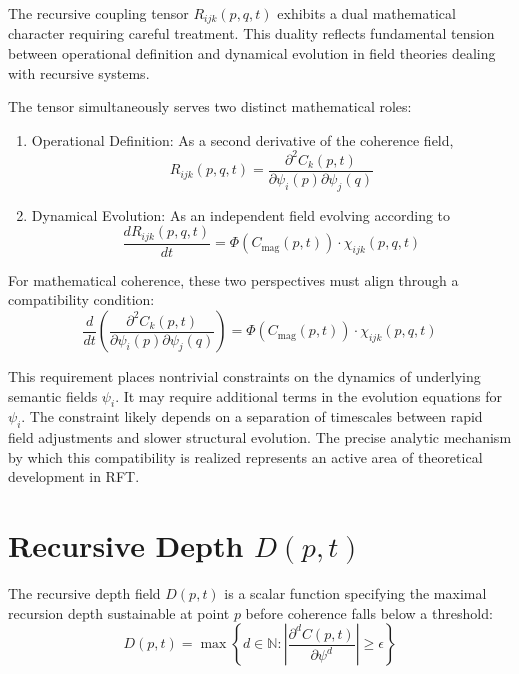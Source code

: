 The recursive coupling tensor \(R_{ijk}(p, q, t)\) exhibits a dual mathematical character requiring careful treatment. This duality reflects fundamental tension between operational definition and dynamical evolution in field theories dealing with recursive systems.

The tensor simultaneously serves two distinct mathematical roles:
\begin{enumerate}
    \item Operational Definition: As a second derivative of the coherence field,
    \begin{equation}
    R_{ijk}(p, q, t) = \frac{\partial^2 C_k(p, t)}{\partial \psi_i(p) \partial \psi_j(q)}
    \end{equation}
    \item Dynamical Evolution: As an independent field evolving according to
    \begin{equation}
    \frac{dR_{ijk}(p, q, t)}{dt} = \Phi(C_{\mathrm{mag}}(p, t)) \cdot \chi_{ijk}(p, q, t)
    \end{equation}
\end{enumerate}

For mathematical coherence, these two perspectives must align through a compatibility condition:
\begin{equation}
\frac{d}{dt}\left(\frac{\partial^2 C_k(p, t)}{\partial \psi_i(p) \partial \psi_j(q)}\right) = \Phi(C_{\mathrm{mag}}(p, t)) \cdot \chi_{ijk}(p, q, t)
\end{equation}

This requirement places nontrivial constraints on the dynamics of underlying semantic fields \(\psi_i\). It may require additional terms in the evolution equations for \(\psi_i\). The constraint likely depends on a separation of timescales between rapid field adjustments and slower structural evolution. The precise analytic mechanism by which this compatibility is realized represents an active area of theoretical development in RFT.

\section{\texorpdfstring{Recursive Depth $D(p, t)$}{Recursive Depth D(p, t)}}

The recursive depth field \(D(p, t)\) is a scalar function specifying the maximal recursion depth sustainable at point \(p\) before coherence falls below a threshold:
\begin{equation}
D(p, t) = \max \left\{ d \in \mathbb{N} : \left| \frac{\partial^d C(p,t)}{\partial \psi^d} \right| \geq \epsilon \right\}
\end{equation}

